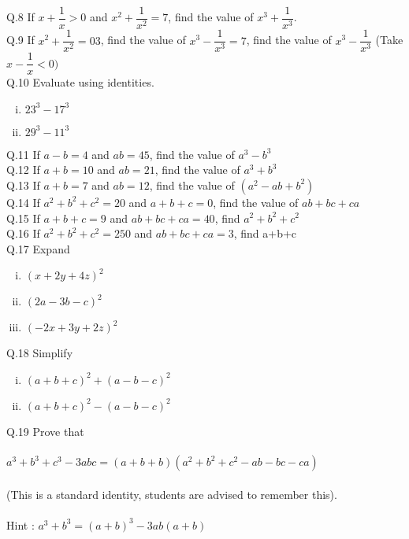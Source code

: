 Q.8 If $x+\dfrac{1}{x} > 0$ and $x^2+\dfrac{1}{x^2} = 7$, find the value of $x^3+\dfrac{1}{x^3}$.\\
Q.9 If $x^2+\dfrac{1}{x^2}= 03$, find the value of $x^3-\dfrac{1}{x^3} = 7$, find the value of $x^3-\dfrac{1}{x^3}$ (Take $x-\dfrac{1}{x} < 0)$ \\
Q.10 Evaluate using identities.
\begin{enumerate}[(i)]
\item $23^3-17^3$
\item $29^3-11^3$
\end{enumerate}
\noindent Q.11 If $a-b = 4$ and $ab = 45$, find the value of $a^3-b^3$\\
Q.12 If $a+b = 10$ and $ab = 21$, find the value of $a^3+b^3$\\
Q.13 If $a+b = 7$ and $ab = 12$, find the value of $(a^2-ab+b^2)$\\
Q.14 If $a^2+b^2+c^2 = 20$ and $a+b+c = 0$, find the value of $ab+bc+ca$\\
Q.15 If $a+b+c = 9$ and $ab+bc+ca = 40$, find $a^2+b^2+c^2$\\
Q.16 If $a^2+b^2+c^2 = 250$ and $ab+bc+ca = 3$, find a+b+c\\
Q.17 Expand
\begin{multicols}{3}
\begin{enumerate}[(i)]
\item $(x+2y+4z)^2$
\item $(2a-3b-c)^2$
\item $(-2x+3y+2z)^2$
\end{enumerate}
\end{multicols}
\noindent Q.18 Simplify
\begin{enumerate}[(i)]
\item $(a+b+c)^2+(a-b-c)^2$
\item $(a+b+c)^2-(a-b-c)^2 $
\end{enumerate}
\noindent Q.19 Prove that\\\\
$a^3+b^3+c^3-3abc = (a+b+b)(a^2+b^2+c^2-ab-bc-ca)$\\\\
(This is a standard identity, students are advised to remember this).\\\\
Hint : $a^3+b^3 = (a+b)^3-3ab(a+b)$\\\\
